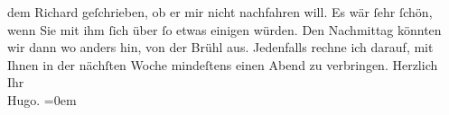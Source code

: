 \begin{ledgroupsized}[t]{13cm}
                    dem Richard geſchrieben, ob er mir nicht
                    nachfahren will. Es wär ſehr ſchön, wenn Sie mit ihm ſich über ſo etwas einigen
                    würden. Den Nachmittag könnten wir dann wo anders hin, von der Brühl aus.\pend
           \pstart
           {\pb}Jedenfalls rechne ich
                    darauf, mit Ihnen in der nächſten Woche mindeſtens einen Abend zu
                    verbringen.\pend
           \pstart
           Herzlich{\\[\baselineskip]} Ihr{\\[\baselineskip]}\spacefill\mbox{Hugo.}\pend
           \leftskip=0em{}\endnumbering{}\end{ledgroupsized}  \newcommand{\dateiname}{L00434}\newcommand{\titel}{Hugo von Hofmannsthal an Arthur Schnitzler, [28. 4. 1895]}\newcommand{\editorInnen}{Martin Anton Müller und Gerd-Hermann Susen}
      